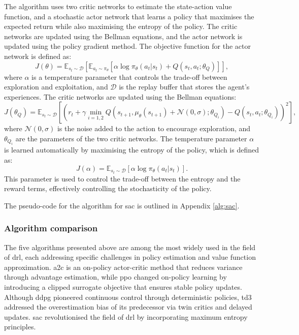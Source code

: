 The algorithm uses two critic networks to estimate the state-action value function, and a stochastic actor network that learns a policy that maximises the expected return while also maximising the entropy of the policy. The critic networks are updated using the Bellman equations, and the actor network is updated using the policy gradient method. The objective function for the actor network is defined as:
\begin{equation}
    J(\theta) = \mathbb{E}_{s_t \sim \mathcal{D}} \left[\mathbb{E}_{a_t \sim \pi_\theta} \left[\alpha \log \pi_\theta(a_t | s_t) + Q(s_t, a_t; \theta_Q)\right]\right],
\end{equation}
where $\alpha$ is a temperature parameter that controls the trade-off between \gls{exploration} and \gls{exploitation}, and $\mathcal{D}$ is the replay buffer that stores the agent's experiences. The critic networks are updated using the Bellman equations:
\begin{equation}
    J(\theta_Q) = \mathbb{E}_{s_t \sim \mathcal{D}} \left[\left(r_t + \gamma \min_{i=1,2} Q(s_{t+1}, \mu_\theta(s_{t+1}) + \mathcal{N}(0, \sigma); \theta_{Q_i}) - Q(s_t, a_t; \theta_{Q_i})\right)^2\right],
\end{equation}
where $\mathcal{N}(0, \sigma)$ is the noise added to the action to encourage exploration, and $\theta_{Q_i}$ are the parameters of the two critic networks. The temperature parameter $\alpha$ is learned automatically by maximising the entropy of the policy, which is defined as:
\begin{equation}
    J(\alpha) = \mathbb{E}_{s_t \sim \mathcal{D}} \left[\alpha \log \pi_\theta(a_t | s_t)\right].
\end{equation}
This parameter is used to control the trade-off between the entropy and the reward terms, effectively controlling the stochasticity of the policy.

The pseudo-code for the algorithm for \acrshort{sac} is outlined in Appendix \ref{alg:sac}.

\subsubsection{Algorithm comparison} \label{sec:algorithmcomparison}

The five algorithms presented above are among the most widely used in the field of \acrshort{drl}, each addressing specific challenges in policy estimation and value function approximation. \acrshort{a2c} is an on-policy actor-critic method that reduces variance through advantage estimation, while \acrshort{ppo} changed on-policy learning by introducing a clipped surrogate objective that ensures stable policy updates. Although \acrshort{ddpg} pioneered continuous control through deterministic policies, \acrshort{td3} addressed the overestimation bias of its predecessor via twin critics and delayed updates. \acrshort{sac} revolutionised the field of \acrshort{drl} by incorporating maximum entropy principles.

